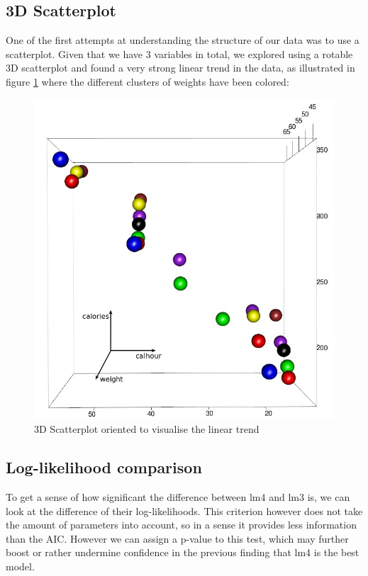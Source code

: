 \documentclass[11pt, a4paper]{article}
\begin{document}
\subsection{3D Scatterplot}
One of the first attempts at understanding the structure of our data
was to use a scatterplot. Given that we have 3 variables in total, we
explored using a rotable 3D scatterplot and found a very strong linear
trend in the data, as illustrated in figure \ref{fig:3DScatterplot}
where the different clusters of weights have been colored:
\begin{figure}[H]
    \centering
    \includegraphics[scale=.4]{3DScatterplot.jpg}
    \caption{3D Scatterplot oriented to visualise the linear trend}
    \label{fig:3DScatterplot}
\end{figure}

\subsection{Log-likelihood comparison}
To get a sense of how significant the difference between lm4 and lm3
is, we can look at the difference of their log-likelihoods. This
criterion however does not take the amount of parameters into account,
so in a sense it provides less information than the AIC. However we
can assign a p-value to this test, which may further boost or rather
undermine confidence in the previous finding that lm4 is the best
model.
\end{document}
